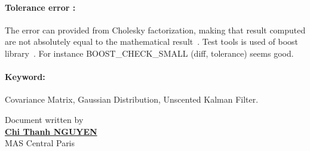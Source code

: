 \documentclass[a4paper,10pt]{article}
\begin{document}
\paragraph{Tolerance error : }
The error can provided from Cholesky factorization, making that result computed are not absolutely equal to the mathematical result~\cite{ErrorTest1}. Test tools is used of boost library~\cite{BoostCheck}. For instance BOOST\_CHECK\_SMALL (diff, tolerance) seems good. 
\paragraph{Keyword: } Covariance Matrix, Gaussian Distribution, Unscented Kalman Filter. 

						      \begin{flushright}
						      Document written by \\
						      \href{mailto:chi-thanh.nguyen@inria.fr}{{\textbf {Chi Thanh NGUYEN}}} \\
						      MAS Central Paris  
						      \end{flushright}



\end{document}
